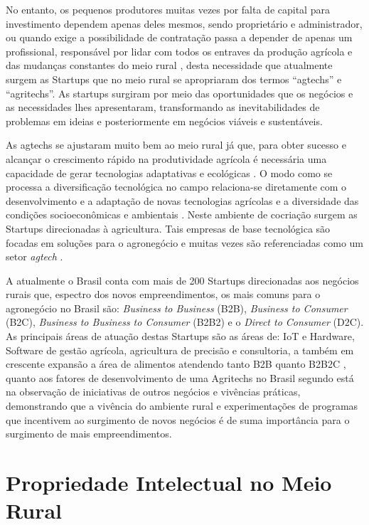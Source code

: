 No entanto, os pequenos produtores muitas vezes por falta de capital para investimento dependem apenas deles mesmos, sendo proprietário e administrador, ou quando exige a possibilidade de contratação passa a depender de apenas um profissional, responsável por lidar com todos os entraves da produção agrícola e das mudanças constantes do meio rural \cite{soares_relacao_2017}, desta necessidade que atualmente surgem as Startups que no meio rural se apropriaram dos termos “agtechs” e “agritechs”. As startups surgiram por meio das oportunidades que os negócios e as necessidades lhes apresentaram, transformando as inevitabilidades de problemas em ideias e posteriormente em negócios viáveis e sustentáveis. 

As agtechs se ajustaram muito bem ao meio rural já que, para obter sucesso e alcançar o crescimento rápido na produtividade agrícola é necessária uma capacidade de gerar tecnologias adaptativas e ecológicas \cite{contini_hayami_2019}. O modo como se processa a diversificação tecnológica no campo relaciona-se diretamente com o desenvolvimento e a adaptação de novas tecnologias agrícolas e a diversidade das condições socioeconômicas e ambientais \cite{fen-azmeyer_o_2019}. Neste ambiente de cocriação surgem as Startups direcionadas à agricultura. Tais empresas de base tecnológica são focadas em soluções para o agronegócio e muitas vezes são referenciadas como um setor \textit{agtech} \cite{blanco_agtechs_2020}.



A atualmente o Brasil conta com mais de 200 Startups direcionadas aos negócios rurais que, espectro dos novos empreendimentos, os mais comuns para o agronegócio no Brasil são: \textit{Business to Business} (B2B), \textit{Business to Consumer} (B2C), \textit{Business to Business to Consumer} (B2B2) e o \textit{Direct to Consumer} (D2C). As principais áreas de atuação destas Startups são as áreas de: IoT e Hardware, Software de gestão agrícola, agricultura de precisão e consultoria, a também em crescente expansão a área de alimentos atendendo tanto B2B quanto B2B2C \cite{abstartups_startupbase_2019}, quanto aos fatores de desenvolvimento de uma Agritechs no Brasil segundo \cite{mondin_2_2018} está na observação de iniciativas de outros negócios e vivências práticas, demonstrando que a vivência do ambiente rural e experimentações de programas que incentivem ao surgimento de novos negócios é de suma importância para o surgimento de mais empreendimentos.


\section{Propriedade Intelectual no Meio Rural}

